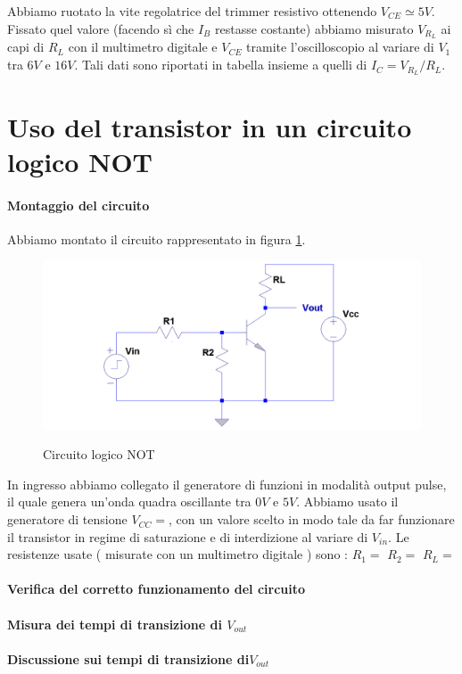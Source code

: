 \documentclass[10pt,a4paper]{article}
\begin{document}
Abbiamo ruotato la vite regolatrice del trimmer resistivo ottenendo $V_{CE}\simeq 5V$. Fissato quel valore  (facendo sì che $I_B$ restasse costante)  abbiamo misurato $V_{R_L}$ ai capi di $R_L$ con il multimetro digitale  e $V_{CE}$ tramite l'oscilloscopio al variare di $V_1$ tra $6 V$ e $16 V$. Tali dati sono riportati in tabella insieme a quelli di $I_C=V_{R_L}/R_L$.

 
\section{Uso del transistor in un circuito logico NOT }
\paragraph{Montaggio del circuito}
Abbiamo montato il circuito rappresentato in  figura \ref{circuito2}.
\begin{figure}[!htb]
  \centering
  \includegraphics[scale=0.4]{circuito2} \label{circuito2}
\caption{Circuito logico NOT}
\label{circuito2}
\end{figure} 

In ingresso abbiamo collegato  il generatore di funzioni in modalità output pulse, il quale genera un’onda quadra oscillante tra $0 V$ e $5 V$. Abbiamo usato  il generatore di tensione $V_{CC}=$, con un valore scelto in modo tale da far funzionare il transistor  in regime di saturazione e di interdizione al variare di $V_{in}$. Le resistenze usate ( misurate con un multimetro digitale ) sono : $R_1=$ $R_2=$ $R_L=$

\paragraph{Verifica del corretto funzionamento del circuito}
\paragraph{Misura dei tempi di transizione di $V_{out}$ }

\paragraph{Discussione sui tempi di transizione di$ V_{out}$}
\end{document}
